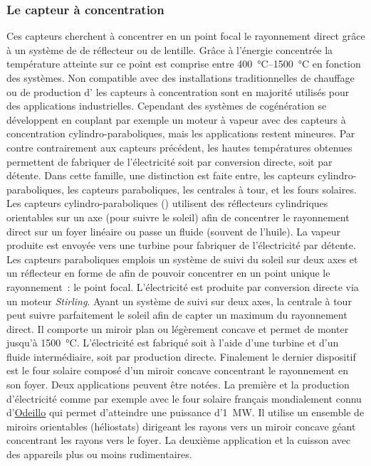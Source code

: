 \subsubsection{Le capteur à concentration} %
\label{ssub:le_capteur_a_concentration}
Ces capteurs cherchent à concentrer en un point focal le rayonnement direct grâce à un
système de de réflecteur ou de lentille. Grâce à l’énergie concentrée la température
atteinte sur ce point est comprise entre \SIrange{400}{1500}{\celsius} en fonction des
systèmes. Non compatible avec des installations traditionnelles de chauffage ou de production
d’ les capteurs à concentration sont en majorité utilisés pour des applications
industrielles. Cependant des systèmes de cogénération se développent en couplant
par exemple un moteur à vapeur avec des capteurs à concentration cylindro-paraboliques,
mais les applications restent mineures.
Par contre contrairement aux capteurs précédent, les hautes températures obtenues
permettent de fabriquer de l’électricité soit par conversion directe, soit par détente.
Dans cette famille, une distinction est faite entre, les capteurs cylindro-paraboliques, les capteurs
paraboliques, les centrales à tour, et les fours solaires. Les capteurs cylindro-paraboliques
() utilisent des réflecteurs
cylindriques orientables sur un axe (pour suivre le soleil) afin de concentrer le
rayonnement direct sur un foyer linéaire ou passe un fluide (souvent de l’huile). La
vapeur produite est envoyée vers une turbine pour fabriquer de l’électricité par détente.
Les capteurs paraboliques emplois un système de suivi du soleil sur deux axes et un
réflecteur en forme de  afin de pouvoir concentrer en un point unique le rayonnement~: le point focal.
L’électricité est produite par conversion directe via un moteur \textit{Stirling}. Ayant un
système de suivi sur deux axes, la centrale à tour peut suivre parfaitement le soleil afin
de capter un maximum du rayonnement direct. Il comporte un miroir plan ou légèrement
concave et permet de monter jusqu’à \SI{1500}{\celsius}. L’électricité est fabriqué soit à
l’aide d’une turbine et d’un fluide intermédiaire, soit par production directe. Finalement
le dernier dispositif est le four solaire composé d’un miroir concave concentrant le
rayonnement en son foyer. Deux applications peuvent être notées. La première et la
production d’électricité comme par exemple avec le four solaire français mondialement
connu d’\href{http://www.promes.cnrs.fr/index.php?page=historique}{Odeillo} qui permet
d’atteindre une puissance d’\SI{1}{\mega\watt}. Il utilise un ensemble de miroirs
orientables (héliostats) dirigeant les rayons vers un miroir concave géant concentrant les
rayons vers le foyer. La deuxième application et la cuisson avec des appareils plus ou
moins rudimentaires.


